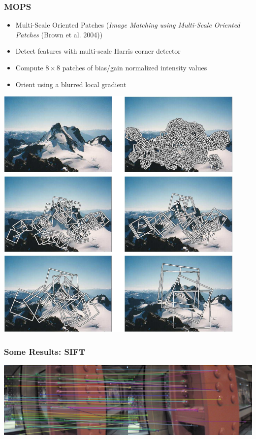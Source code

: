 \documentclass[xcolor=x11names,compress,t]{beamer}
\renewcommand{\(}{\begin{columns}}
\renewcommand{\)}{\end{columns}}
\newcommand{\<}[1]{\begin{column}{#1}}
\renewcommand{\>}{\end{column}}
\begin{document}
\begin{frame}
  \frametitle{MOPS}
  \begin{itemize}
  \item Multi-Scale Oriented Patches (\emph{Image Matching using Multi-Scale Oriented Patches} (Brown et al. 2004))
  \item Detect features with multi-scale Harris corner detector
  \item Compute $8 \times 8$ patches of bias/gain normalized intensity values
  \item Orient using a blurred local gradient
  \end{itemize}
  \begin{center}
    \includegraphics[resolution=150, scale=0.65]{images/mops-features.png}
  \end{center}
\end{frame}

\begin{frame}
  \frametitle{Some Results: SIFT}
  \includegraphics[resolution=150, scale=0.52]{images/sift-matches.jpg}
\end{frame}
\end{document}
